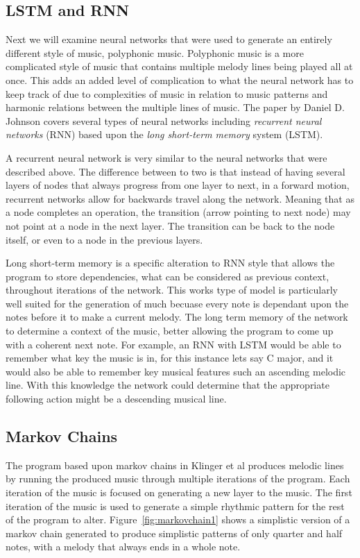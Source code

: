 \documentclass{sig-alternate}
\begin{document}
\subsection{LSTM and RNN}
\label{sec:lstm}
 	Next we will examine neural networks that were used to generate an entirely different style of music, polyphonic music. Polyphonic music is a more complicated style of music that contains multiple melody lines being played all at once. This adds an added level of complication to what the neural network has to keep track of due to complexities of music in relation to music patterns and harmonic relations between the multiple lines of music. The paper by Daniel D. Johnson covers several types of neural networks including \textit{recurrent neural networks} (RNN) based upon the \textit{long short-term memory} system (LSTM).

	 A recurrent neural network is very similar to the neural networks that were described above. The difference between to two is that instead of having several layers of nodes that always progress from one layer to next, in a forward motion, recurrent networks allow for backwards travel along the network. Meaning that as a node completes an operation, the transition (arrow pointing to next node) may not point at a node in the next layer. The transition can be back to the node itself, or even to a node in the previous layers.
	
	Long short-term memory is a specific alteration to RNN style that allows the program to store dependencies, what can be considered as previous context, throughout iterations of the network. This works type of model is particularly well suited for the generation of much becuase every note is dependant upon the notes before it to make a current melody. The long term memory of the network to determine a context of the music, better allowing the program to come up with a coherent next note. For example, an RNN with LSTM would be able to remember what key the music is in, for this instance lets say C major, and it would also be able to remember key musical features such an ascending melodic line. With this knowledge the network could determine that the appropriate following action might be a descending musical line.

\subsection{Markov Chains}
\label{sec:markovmethods}
	The program based upon markov chains in Klinger et al produces melodic lines by running the produced music through multiple iterations of the program. Each iteration of the music is focused on generating a new layer to the music. The first iteration of the music is used to generate a simple rhythmic pattern for the rest of the program to alter. Figure~\ref{fig:markovchain1} shows a simplistic version of a markov chain generated to produce simplistic patterns of only quarter and half notes, with a melody that always ends in a whole note.
	
\end{document}
